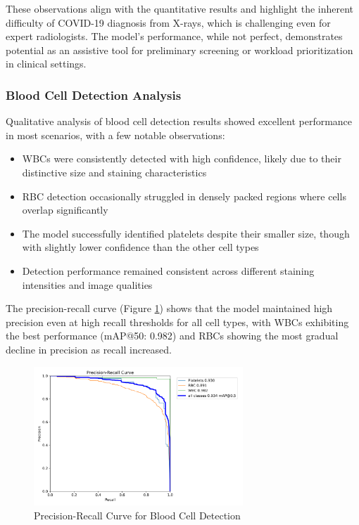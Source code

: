 \begin{multicols}{2}
These observations align with the quantitative results and highlight the inherent difficulty of COVID-19 diagnosis from X-rays, which is challenging even for expert radiologists. The model's performance, while not perfect, demonstrates potential as an assistive tool for preliminary screening or workload prioritization in clinical settings.

\subsubsection{Blood Cell Detection Analysis}

Qualitative analysis of blood cell detection results showed excellent performance in most scenarios, with a few notable observations:

\begin{itemize}
    \item WBCs were consistently detected with high confidence, likely due to their distinctive size and staining characteristics
    \item RBC detection occasionally struggled in densely packed regions where cells overlap significantly
    \item The model successfully identified platelets despite their smaller size, though with slightly lower confidence than the other cell types
    \item Detection performance remained consistent across different staining intensities and image qualities
\end{itemize}

The precision-recall curve (Figure \ref{fig:blood_cell_pr}) shows that the model maintained high precision even at high recall thresholds for all cell types, with WBCs exhibiting the best performance (mAP@50: 0.982) and RBCs showing the most gradual decline in precision as recall increased.
\end{multicols}

\begin{figure}[ht]
\centering
\includegraphics[width=0.7\textwidth]{datas/blood_cell_summary_datas/blood_cells_PR_curve.png}
\caption{Precision-Recall Curve for Blood Cell Detection}
\label{fig:blood_cell_pr}
\end{figure}

